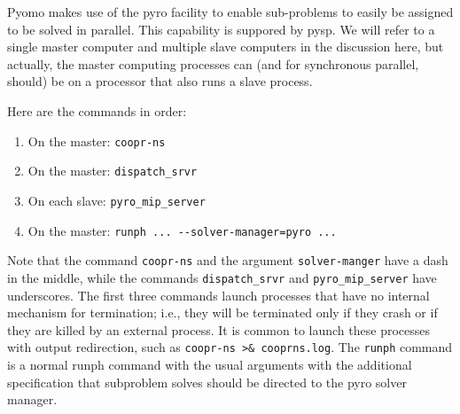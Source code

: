 Pyomo makes use of the pyro facility to enable sub-problems to easily be
assigned to be solved in parallel. This capability is suppored by pysp. We will
refer to a single master computer and multiple slave computers in the discussion
here, but actually, the master computing processes can (and for synchronous
parallel, should) be on a processor that also runs a slave process.

Here are the commands in order:

\begin{enumerate}
  \item On the master: \verb|coopr-ns|
  \item On the master: \verb|dispatch_srvr|
  \item On each slave: \verb|pyro_mip_server|
  \item On the master: \verb|runph ... --solver-manager=pyro ...|
\end{enumerate}

Note that the command \verb|coopr-ns| and the argument \verb|solver-manger| have
a dash in the middle, while the commands \verb|dispatch_srvr| and
\verb|pyro_mip_server| have underscores. The first three commands launch
processes that have no internal mechanism for termination; i.e., they will be
terminated only if they crash or if they are killed by an external process. It
is common to launch these processes with output redirection, such as
\verb|coopr-ns >& cooprns.log|. The \verb|runph| command is a normal runph
command with the usual arguments with the additional specification that
subproblem solves should be directed to the pyro solver manager.
